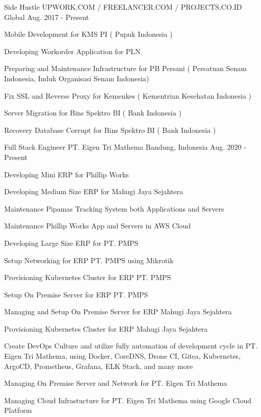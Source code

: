 \begin{cventries}
\cventry
  {Side Hustle} %
  {UPWORK.COM / FREELANCER.COM / PROJECTS.CO.ID } %
  {Global} %
  {Aug. 2017 - Present} %
  {
    \begin{cvitems} %
      \item {Mobile Development for KMS PI ( Pupuk Indonesia ) }
      \item {Developing Workorder Application for PLN }
      \item {Preparing and Maintenance Infrastructure for PB Persani ( Persatuan Senam Indonesia, Induk Organisasi Senam Indonesia) }
      \item {Fix SSL and Reverse Proxy for Kemenkes ( Kementrian Kesehatan Indonesia ) }
      \item {Server Migration for Bins Spektro BI ( Bank Indonesia ) }
      \item {Recovery Database Corrupt for Bins Spektro BI ( Bank Indonesia ) }
    \end{cvitems}
  }

  \cventry
    {Full Stack Engineer} %
    {PT. Eigen Tri Mathema} %
    {Bandung, Indonesia} %
    {Aug. 2020 - Present} %
    {
      \begin{cvitems} %
        \item {Developing Mini ERP for Phillip Works}
        \item {Developing Medium Size ERP for Mahugi Jaya Sejahtera}
        \item {Maintenance Pipamas Tracking System both Applications and Servers}
        \item {Maintenance Phillip Works App and Servers in AWS Cloud}
        \item {Developing Large Size ERP for PT. PMPS}
        \item {Setup Networking for ERP PT. PMPS using Mikrotik}
        \item {Provisioning Kubernetes Cluster for ERP PT. PMPS}
        \item {Setup On Premise Server for ERP PT. PMPS}
        \item {Managing and Setup On Premise Server for ERP Mahugi Jaya Sejahtera}
        \item {Provisioning Kubernetes Cluster for ERP Mahugi Jaya Sejahtera}
        \item {Create DevOps Culture and utilize fully automation of development cycle in PT. Eigen Tri Mathema, using Docker, CoreDNS, Drone CI, Gitea, Kubernetes, ArgoCD, Prometheus, Grafana, ELK Stack, and many more}
        \item {Managing On Premise Server and Network for PT. Eigen Tri Mathema}
        \item {Managing Cloud Infrastucture for PT. Eigen Tri Mathema using Google Cloud Platform}
      \end{cvitems}
    }


\end{cventries}
